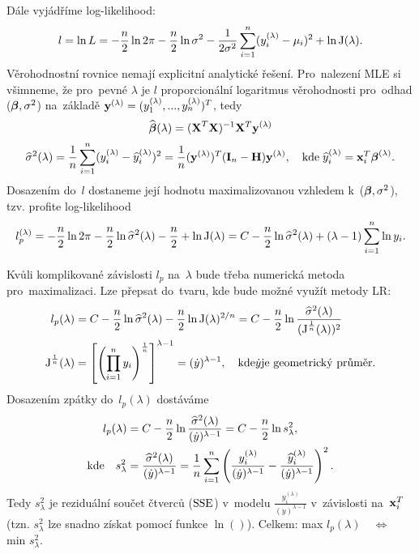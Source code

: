 Dále vyjádříme log-likelihood:
 $$
 l = \ln L = -\frac{n}{2}\ln 2 \pi - \frac{n}{2}\ln \sigma^2 - \frac{1}{2 \sigma^2} \sum\limits_{i=1}^{n} (y_i^{(\lambda)} - \mu_i)^2 + \ln\text{J}(\lambda).
 $$
Věrohodnostní rovnice nemají explicitní analytické řešení. Pro~nalezení MLE si všimneme, že pro~pevné $\lambda$ je $l$ proporcionální logaritmus věrohodnosti pro~odhad ($\boldsymbol{\beta}, \sigma^2$) na~základě $\mathbf{y}^{(\lambda)} = (y_1^{(\lambda)},..., y_n^{(\lambda)})^T$, tedy
 $$
 \widehat{\boldsymbol{\beta}} (\lambda) = {(\textbf{X}^T\textbf{X})^{-1}} \mathbf{X}^T \mathbf{y}^{(\lambda)}
 $$
 $$
 \widehat{\sigma}^2 (\lambda) = \frac{1}{n} \sum\limits_{i=1}^{n} (y_i^{(\lambda)} - \widehat{y} _i^{(\lambda)})^2 = \frac{1}{n} (\mathbf{y}^{(\lambda)})^T (\textbf{I} _n - \textbf{H}) \mathbf{y}^{(\lambda)}, \quad \text{kde} \; \widehat{y}_i^{(\lambda)} = \mathbf{x}_i^T \boldsymbol{\beta}^{(\lambda)}.
 $$
Dosazením do~$l$ dostaneme její hodnotu maximalizovanou vzhledem k~($\boldsymbol{\beta}, \sigma^2$), tzv. profite log-likelihood
 $$
  l_p^{(\lambda)} = -\frac{n}{2} \ln 2 \pi - \frac{n}{2} \ln \widehat{\sigma}^2 (\lambda) - \frac{n}{2} + \ln \text{J}(\lambda)
 = C - \frac{n}{2} \ln \widehat{\sigma}^2 (\lambda) + (\lambda - 1)  \sum\limits_{i=1}^{n} \ln y_i.
 $$
\begin{remark}
Kvůli komplikované závislosti $l_p$ na~$\lambda$ bude třeba numerická metoda pro~maximalizaci. Lze přepsat do~tvaru, kde bude možné využít metody LR:
\begin{align*}
 l_p (\lambda) & = C - \frac{n}{2} \ln \widehat{\sigma}^2 (\lambda)  - \frac{n}{2} \ln\text{J}(\lambda)^{2/n} = C - \frac{n}{2} \ln \frac{ \widehat{\sigma}^2 (\lambda)}{(\text{J}^{\frac{1}{n}}(\lambda))^2} \\
 \text{J}^{\frac{1}{n}}(\lambda) & = \left[\left(\prod_{i = 1}^n y_i \right)^{\frac{1}{n}} \right]^{\lambda - 1} = (\dot{y})^{\lambda - 1}, \quad \text{kde} \dot{y} \text{je geometrický průměr.}
\end{align*}
Dosazením zpátky do~$l_p(\lambda)$ dostáváme
\begin{align*}
\quad  l_p(\lambda) & = C - \frac{n}{2} \ln \frac{ \widehat{\sigma}^2 (\lambda)}{(\dot{y})^{\lambda - 1}} = C - \frac{n}{2}\ln s_{\lambda}^2, \\
\text{kde} \quad s_{\lambda}^2 & = \frac{ \widehat{\sigma}^2 (\lambda)}{(\dot{y})^{\lambda - 1}} = \frac{1}{n} \sum\limits_{i=1}^{n} \left(\frac{y_i^{(\lambda)}}{(\dot{y})^{\lambda-1}} - \frac{\widehat{y}_i^{(\lambda)}}{(\dot{y})^{\lambda-1}} \right)^2.
\end{align*}
Tedy $s_{\lambda}^2$ je reziduální součet čtverců ($\mathrm{SSE}$) v~modelu $\frac{y_i^{(\lambda)}}{(\dot{y})^{\lambda-1}}$ v~závislosti na~$\mathbf{x}_i^T$ (tzn. $s_{\lambda}^2$ lze snadno získat pomocí funkce $\ln()$). Celkem: max $l_p(\lambda) \quad \Leftrightarrow \quad$ min $s_{\lambda}^2$.
\end{remark}

